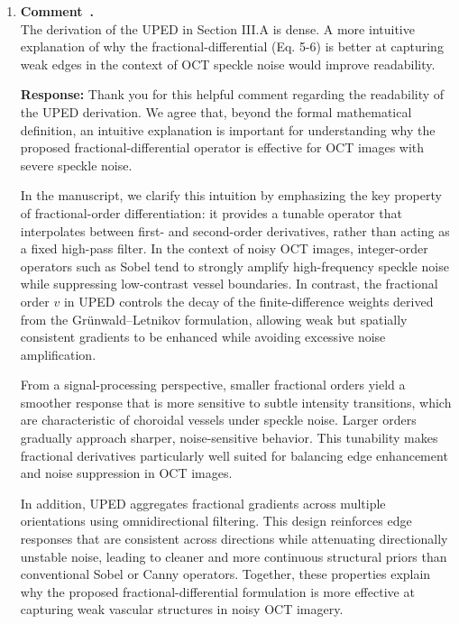 \documentclass[11pt]{article}
\newcommand{\commentresponse}[2]{{\color{blue}\textbf{Response:} #2}}
\newcommand{\commentitem}{\item \textbf{Comment~\arabic{enumi}.}\\\ignorespaces}
\begin{document}
\begin{enumerate}
    \commentitem The derivation of the UPED in Section III.A is dense. A more intuitive explanation of why the fractional-differential (Eq. 5-6) is better at capturing weak edges in the context of OCT speckle noise would improve readability.
    
    \commentresponse{8}{
    Thank you for this helpful comment regarding the readability of the UPED derivation. We agree that, beyond the formal mathematical definition, an intuitive explanation is important for understanding why the proposed fractional-differential operator is effective for OCT images with severe speckle noise.

    In the manuscript, we clarify this intuition by emphasizing the key property of fractional-order differentiation: it provides a tunable operator that interpolates between first- and second-order derivatives, rather than acting as a fixed high-pass filter. In the context of noisy OCT images, integer-order operators such as Sobel tend to strongly amplify high-frequency speckle noise while suppressing low-contrast vessel boundaries. In contrast, the fractional order $v$ in UPED controls the decay of the finite-difference weights derived from the Grünwald--Letnikov formulation, allowing weak but spatially consistent gradients to be enhanced while avoiding excessive noise amplification.

    From a signal-processing perspective, smaller fractional orders yield a smoother response that is more sensitive to subtle intensity transitions, which are characteristic of choroidal vessels under speckle noise. Larger orders gradually approach sharper, noise-sensitive behavior. This tunability makes fractional derivatives particularly well suited for balancing edge enhancement and noise suppression in OCT images.

    In addition, UPED aggregates fractional gradients across multiple orientations using omnidirectional filtering. This design reinforces edge responses that are consistent across directions while attenuating directionally unstable noise, leading to cleaner and more continuous structural priors than conventional Sobel or Canny operators. Together, these properties explain why the proposed fractional-differential formulation is more effective at capturing weak vascular structures in noisy OCT imagery.
    }
\end{enumerate}
\end{document}
